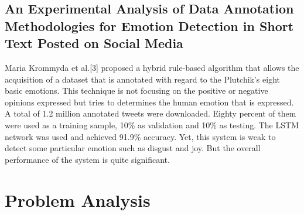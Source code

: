 \subsection{An Experimental Analysis of Data Annotation Methodologies for Emotion Detection in Short Text Posted on Social Media}

Maria Krommyda et al.[3] proposed a hybrid rule-based algorithm that allows the acquisition of a dataset that is annotated with regard to the Plutchik's eight basic emotions. This technique is not focusing on the positive or negative opinions expressed but tries to determines the human emotion that is expressed. A total of 1.2 million annotated tweets were downloaded. Eighty percent of them were used as a training sample, 10\% as validation and 10\% as testing. The LSTM network was used and achieved 91.9\% accuracy. Yet, this system is weak to detect some particular emotion such as disgust and joy. But the overall performance of the system is quite significant. 


\section{Problem Analysis}






